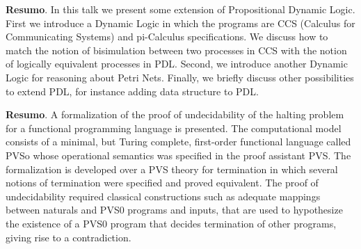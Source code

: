 	
	\noindent\textbf{Resumo}.\label{mb} 
	 In this talk we present some extension of Propositional Dynamic Logic. First we introduce a Dynamic Logic in which the programs are CCS (Calculus for Communicating Systems) and pi-Calculus specifications. We discuss how to match the notion of bisimulation between two processes in  CCS  with the notion of logically equivalent processes in PDL. Second, we introduce another Dynamic Logic for reasoning about Petri Nets. Finally, we briefly discuss other possibilities to extend PDL, for instance adding data structure  to PDL.

	\vspace{24pt}


	
	
	\noindent\textbf{Resumo}.\label{tmfr} 
	A formalization of the proof of undecidability of the halting problem for a functional programming language is presented. The computational model consists of a minimal, but Turing complete, first-order functional  language called PVSo whose operational semantics was specified in the proof assistant PVS. The formalization is developed over a PVS theory for termination in which several notions of termination were specified and proved 
	equivalent. The proof of undecidability required classical 	constructions such as adequate mappings between naturals and PVS0 programs and inputs, that are used to hypothesize the existence of a PVS0 program that decides termination of other programs, giving rise to a contradiction.
	
	\vspace{24pt}

	
	
